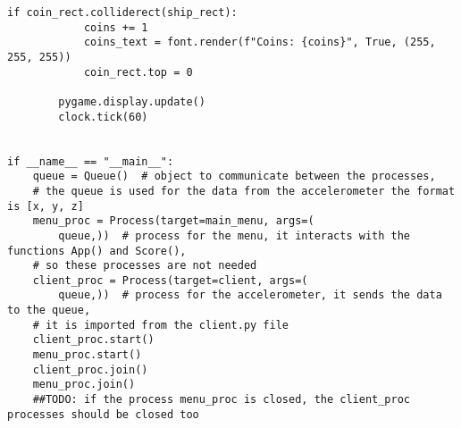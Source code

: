 \documentclass[12pt]{report}			%
\begin{document}
\begin{appendices}
\begin{lstlisting}[title={Program hra.py}, caption={hra.py},  label={lst:hra}]
        if coin_rect.colliderect(ship_rect):
            coins += 1
            coins_text = font.render(f"Coins: {coins}", True, (255, 255, 255))
            coin_rect.top = 0

        pygame.display.update()
        clock.tick(60)


if __name__ == "__main__":
    queue = Queue()  # object to communicate between the processes,
    # the queue is used for the data from the accelerometer the format is [x, y, z]
    menu_proc = Process(target=main_menu, args=(
        queue,))  # process for the menu, it interacts with the functions App() and Score(),
    # so these processes are not needed
    client_proc = Process(target=client, args=(
        queue,))  # process for the accelerometer, it sends the data to the queue,
    # it is imported from the client.py file
    client_proc.start()
    menu_proc.start()
    client_proc.join()
    menu_proc.join()
    ##TODO: if the process menu_proc is closed, the client_proc processes should be closed too

\end{lstlisting}
	\end{appendices}
\end{document}
